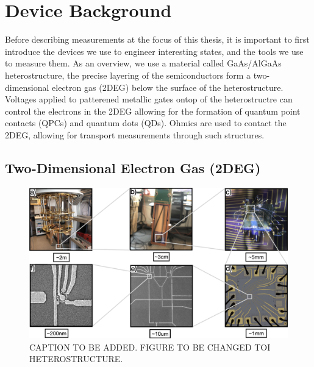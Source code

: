 \chapter{Device Background}\label{cha:device_background}

Before describing measurements at the focus of this thesis, it is important to first introduce the devices we use to engineer interesting states, and the tools we use to measure them. As an overview, we use a material called GaAs/AlGaAs heterostructure, the precise layering of the semiconductors form a two-dimensional electron gas (2DEG) below the surface of the heterostructure. Voltages applied to patterened metallic gates ontop of the heterostructre can control the electrons in the 2DEG allowing for the formation of quantum point contacts (QPCs) and quantum dots  (QDs). Ohmics are used to contact the 2DEG, allowing for transport measurements through such structures. 

\section{Two-Dimensional Electron Gas (2DEG)}



\begin{figure}[!htb]
  \begin{center}
    \includegraphics[width=1.0\textwidth]{figures/ch1/crop_PosterFiguresMaster.001.png}
    \caption[Two-dimensional electron gas in a GaAs/AlGaAs heterostructure]{\label{fig:ch1/2deg} 
    CAPTION TO BE ADDED. FIGURE TO BE CHANGED TOI HETEROSTRUCTURE.  
      }
  \end{center}
\end{figure}




